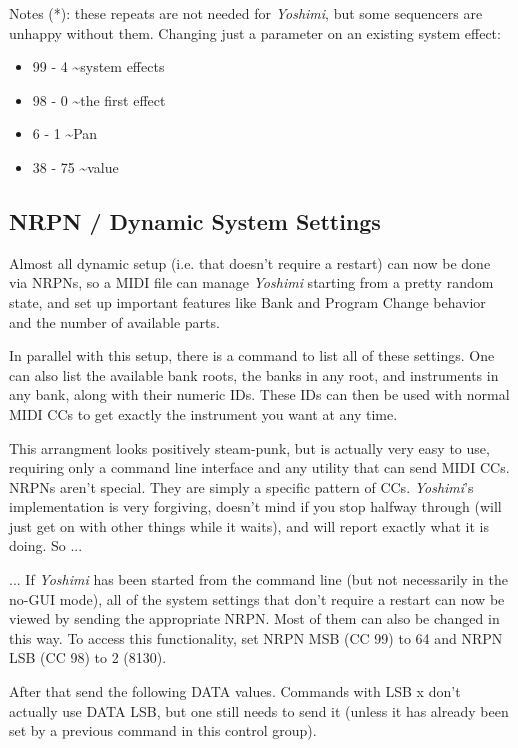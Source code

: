    Notes (*): these repeats are not needed for \textsl{Yoshimi},
   but some sequencers are unhappy without them.
   Changing just a parameter on an existing system effect:

   \begin{itemize}
      \item 99 -   4 \textasciitilde system effects
      \item 98 -   0 \textasciitilde the first effect
      \item 6 -   1 \textasciitilde Pan
      \item 38 -  75 \textasciitilde value
   \end{itemize}

\subsection{NRPN / Dynamic System Settings}
\label{subsection:nrpns_dynamic_system_settings}

   Almost all dynamic setup (i.e. that doesn't require a restart) can now be
   done via NRPNs, so a MIDI file can manage \textsl{Yoshimi} starting from a
   pretty random state, and set up important features like Bank and Program
   Change behavior and the number of available parts.

   In parallel with this setup, there is a command to list all of these
   settings. One can also list the available bank roots, the banks in any
   root, and instruments in any bank, along with their numeric IDs. These IDs
   can then be used with normal MIDI CCs to get exactly the instrument you
   want at any time.

   This arrangment looks positively steam-punk, but is actually very easy to
   use, requiring only a command line interface and any utility that can send
   MIDI CCs. NRPNs aren't special. They are simply a specific pattern of CCs.
   \textsl{Yoshimi}'s implementation is very forgiving, doesn't mind if you
   stop halfway through (will just get on with other things while it waits),
   and will report exactly what it is doing.  So ...

   ... If \textsl{Yoshimi} has been started from the command line (but not
   necessarily in the no-GUI mode), all of the system settings that don't
   require a restart can now be viewed by sending the appropriate NRPN. Most
   of them can also be changed in this way.
   To access this functionality, set NRPN MSB (CC 99) to 64 and NRPN LSB (CC
   98) to 2 (8130).

   After that send the following DATA values. Commands with LSB x don't
   actually use DATA LSB, but one still needs to send it (unless it has
   already been set by a previous command in this control group).

